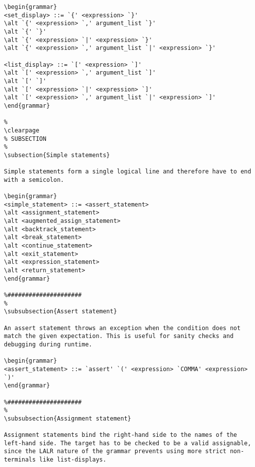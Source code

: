 \begin{verbatim}
\begin{grammar}
<set_display> ::= `{' <expression> `}'
\alt `{' <expression> `,' argument_list `}'
\alt `{' `}'
\alt `{' <expression> `|' <expression> `}'
\alt `{' <expression> `,' argument_list `|' <expression> `}'

<list_display> ::= `[' <expression> `]'
\alt `[' <expression> `,' argument_list `]'
\alt `[' `]'
\alt `[' <expression> `|' <expression> `]'
\alt `[' <expression> `,' argument_list `|' <expression> `]'
\end{grammar}

%
\clearpage
% SUBSECTION
%
\subsection{Simple statements}

Simple statements form a single logical line and therefore have to end with a semicolon.

\begin{grammar}
<simple_statement> ::= <assert_statement>
\alt <assignment_statement>
\alt <augmented_assign_statement>
\alt <backtrack_statement>
\alt <break_statement>
\alt <continue_statement>
\alt <exit_statement>
\alt <expression_statement>
\alt <return_statement>
\end{grammar}

%#####################
%
\subsubsection{Assert statement}

An assert statement throws an exception when the condition does not match the given expectation. This is useful for sanity checks and debugging during runtime.

\begin{grammar}
<assert_statement> ::= `assert' `(' <expression> `COMMA' <expression> `)'
\end{grammar}

%#####################
%
\subsubsection{Assignment statement}

Assignment statements bind the right-hand side to the names of the left-hand side. The target has to be checked to be a valid assignable, since the LALR nature of the grammar prevents using more strict non-terminals like list-displays.


\end{verbatim}

